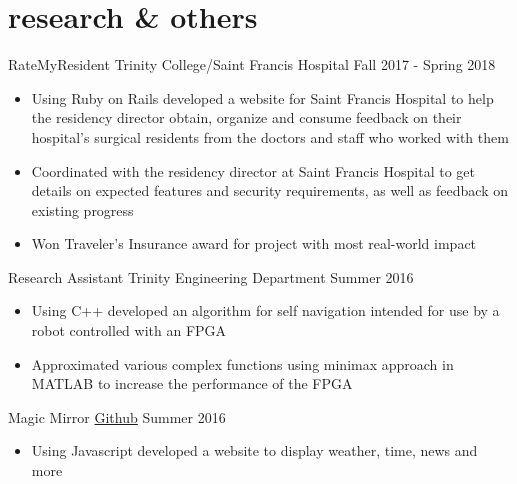 \documentclass{johnsona_cv}
\begin{document}
\section{research \& others}
\begin{entrylist}

    \entry
    {RateMyResident}
    {Trinity College/Saint Francis Hospital}
    {Fall 2017 - Spring 2018}
    {
    \begin{itemize}
        \item Using Ruby on Rails developed a website for Saint Francis Hospital to help the residency director obtain, organize and consume feedback on their hospital's surgical residents from the doctors and staff who worked with them
        \item Coordinated with the residency director at Saint Francis Hospital to get details on expected features and security requirements, as well as feedback on existing progress
        \item Won Traveler's Insurance award for project with most real-world impact
    \end{itemize}
    }

    \entry
    {Research Assistant}
    {Trinity Engineering Department}
    {Summer 2016}
    {
    \begin{itemize}
        \item Using C++ developed an algorithm for self navigation intended for use by a robot controlled with an FPGA
        \item Approximated various complex functions using minimax approach in MATLAB to increase the performance of the FPGA
    \end{itemize}
    }

    \entry
    {Magic Mirror}
    {\href{https://github.com/ajohnson0012/Magic-Mirror}{Github}}
    {Summer 2016}
    {
    \begin{itemize}
    \item Using Javascript developed a website to display weather, time, news and more
    \end{itemize}
    }

\end{entrylist}
\end{document}
